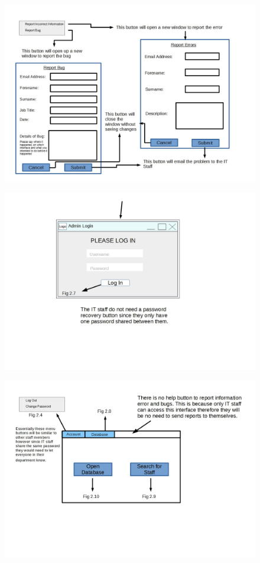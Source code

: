 \begin{figure}[H]
\includegraphics[width=\textwidth,angle=90]{GUI_Design5.jpg}
\caption{}
\end{figure}

\begin{figure}[H]
\includegraphics[width=\textwidth,angle=90]{GUI_Design6.jpg}
\caption{}
\end{figure}

\begin{figure}[H]
\includegraphics[width=\textwidth,angle=90]{GUI_Design7.jpg}
\caption{}
\end{figure}


